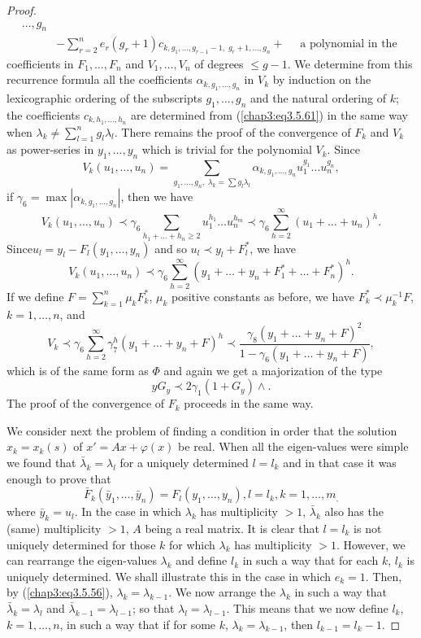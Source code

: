 \begin{proof}
\begin{align*}
{    \ldots, g_n}\\ 
& -\sum\limits^n_{r=2} e_r(g_r+1) c_{k, g_1,\ldots, g_{r-1} -1, \;
    g_r+1, \ldots, g_n} +  \quad \text{ a polynomial in the } 
\end{align*}
coefficients in $F_1, \ldots, F_n$ and $V_1,\ldots, V_n$ of degrees
$\leq g-1$. We determine from this recurrence formula all the
coefficients $\alpha_{k, g_1, \ldots, g_n}$ in $V_k$ by induction on
the lexicographic ordering of the subscripts $g_1, \ldots, g_n$ and
the natural ordering of $k$; the coefficients $c_{k, h_1, \ldots,
  h_n}$ are determined from (\ref{chap3:eq3.5.61}) in the same way
when $\lambda_k \neq \sum\limits^n_{l=1} g_l \lambda_l$. There remains
the proof of the convergence of $F_k$ and $V_k$ as power-series in
$y_1, \ldots, y_n$ which is trivial for the polynomial $V_k$. Since 
$$
V_k(u_1, \ldots, u_n) = \sum\limits_{g_1, \ldots, g_n, \; \lambda_k =
  \sum g_l \lambda_l} \alpha_{k, g_1, \ldots, g_n} u^{g_1}_1 \ldots
u^{g_n}_n, 
$$
if $\gamma_6 = \max |\alpha_{k,g_1, \ldots, g_n}|$, then we have 
$$
V_k (u_1,\ldots, u_n) \prec \gamma_6 \sum\limits_{h_1 + \ldots + h_n
  \geq 2} u^{h_1}_1 \ldots u^{h_m}_n \prec \gamma_6
\sum\limits^\infty_{h=2} (u_1+ \ldots + u_n)^h.  
$$
Since\pageoriginale $u_l = y_l - F_l(y_1, \ldots, y_n)$ and so $u_l
\prec y_l + F^*_l$, we have  
$$
V_k (u_1, \ldots, u_n) \prec \gamma_6 \sum\limits^\infty_{h=2} (y_1+
\ldots + y_n + F^*_1 + \ldots + F^*_n)^h. 
$$
If we define $F = \sum\limits^n_{k=1} \mu_k F^*_k$, $\mu_k$ positive
constants as before, we have $F^*_k \prec \mu^{-1}_k F$, $k =1,
\ldots, n$, and  
$$
V_k \prec \gamma_6 \sum\limits^\infty_{h=2} \gamma^h_7 (y_1 + \ldots +
y_n + F)^h \prec \frac{\gamma_8(y_1 + \ldots + y_n + F)^2}{1-\gamma_6
  (y_1 + \ldots + y_n + F)}, 
$$
which is of the same form as $\Phi$ and again we get a majorization of
the type 
$$
y  G_y \prec 2 \gamma_1 (1+ G_y) \wedge.
$$
The proof of the convergence of $F_k$ proceeds in the same way. 

We consider next the problem of finding a condition in order that the
solution $x_k = x_k(s)$ of $x' = Ax + \varphi (x)$ be real. When all
the eigen-values were simple we found that $\bar{\lambda}_k =
\lambda_l$ for a uniquely determined $l=l_k$ and in that case it was
enough to prove that 
$$
\bar{F}_k(\bar{y}_1, \ldots , \bar{y}_n) = F_l (y_1, \ldots, y_n), l
=l_k, k =1,\ldots, m_, 
$$
where $\bar{y}_k = u_l$. In the case in which $\lambda_k$ has
multiplicity $>1$, $\bar{\lambda}_k$ also has the (same) multiplicity
$>1$, $A$ being a real matrix. It is clear that $l=l_k$ is not
uniquely determined for those $k$ for which $\lambda_k$ has
multiplicity $>1$. However, we can rearrange the eigen-values
$\lambda_k$ and define $l_k$ in such a way that for each\pageoriginale
$k$, $l_k$ is uniquely determined. We shall illustrate  this in the
case in which $e_k =1$. Then, by (\ref{chap3:eq3.5.56}), $\lambda_k =
\lambda_{k-1}$. We now arrange the $\lambda_k$ in such a way that
$\bar{\lambda}_k = \lambda_l$ and $\bar{\lambda}_{k-1} =
\lambda_{l-1}$; so that $\lambda_l = \lambda_{l-1}$. This means that
we now define $l_k$, $k =1, \ldots, n$, in such a way that if for some
$k$, $\lambda_k = \lambda_{k-1}$, then $l_{k-1} = l_k - 1$. 


\end{proof}
